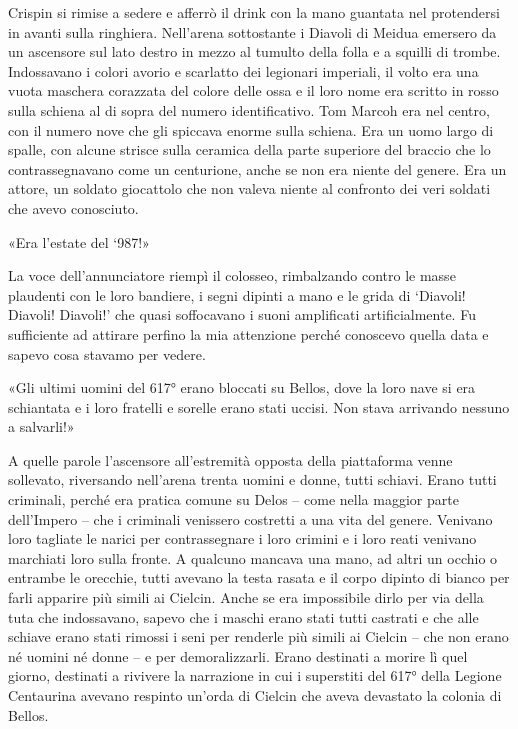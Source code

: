 Crispin si rimise a sedere e afferrò il drink con la mano guantata nel
protendersi in avanti sulla ringhiera. Nell'arena sottostante i Diavoli
di Meidua emersero da un ascensore sul lato destro in mezzo al tumulto
della folla e a squilli di trombe. Indossavano i colori avorio e
scarlatto dei legionari imperiali, il volto era una vuota maschera
corazzata del colore delle ossa e il loro nome era scritto in rosso
sulla schiena al di sopra del numero identificativo. Tom Marcoh era nel
centro, con il numero nove che gli spiccava enorme sulla schiena. Era un
uomo largo di spalle, con alcune strisce sulla ceramica della parte
superiore del braccio che lo contrassegnavano come un centurione, anche
se non era niente del genere. Era un attore, un soldato giocattolo che
non valeva niente al confronto dei veri soldati che avevo conosciuto.

«Era l'estate del `987!»

La voce dell'annunciatore riempì il colosseo, rimbalzando contro le
masse plaudenti con le loro bandiere, i segni dipinti a mano e le grida
di `Diavoli! Diavoli! Diavoli!' che quasi soffocavano i suoni
amplificati artificialmente. Fu sufficiente ad attirare perfino la mia
attenzione perché conoscevo quella data e sapevo cosa stavamo per
vedere.

«Gli ultimi uomini del 617° erano bloccati su Bellos, dove la loro nave
si era schiantata e i loro fratelli e sorelle erano stati uccisi. Non
stava arrivando nessuno a salvarli!»

A quelle parole l'ascensore all'estremità opposta della piattaforma
venne sollevato, riversando nell'arena trenta uomini e donne, tutti
schiavi. Erano tutti criminali, perché era pratica comune su Delos --
come nella maggior parte dell'Impero -- che i criminali venissero
costretti a una vita del genere. Venivano loro tagliate le narici per
contrassegnare i loro crimini e i loro reati venivano marchiati loro
sulla fronte. A qualcuno mancava una mano, ad altri un occhio o entrambe
le orecchie, tutti avevano la testa rasata e il corpo dipinto di bianco
per farli apparire più simili ai Cielcin. Anche se era impossibile dirlo
per via della tuta che indossavano, sapevo che i maschi erano stati
tutti castrati e che alle schiave erano stati rimossi i seni per
renderle più simili ai Cielcin -- che non erano né uomini né donne -- e
per demoralizzarli. Erano destinati a morire lì quel giorno, destinati a
rivivere la narrazione in cui i superstiti del 617° della Legione
Centaurina avevano respinto un'orda di Cielcin che aveva devastato la
colonia di Bellos.

